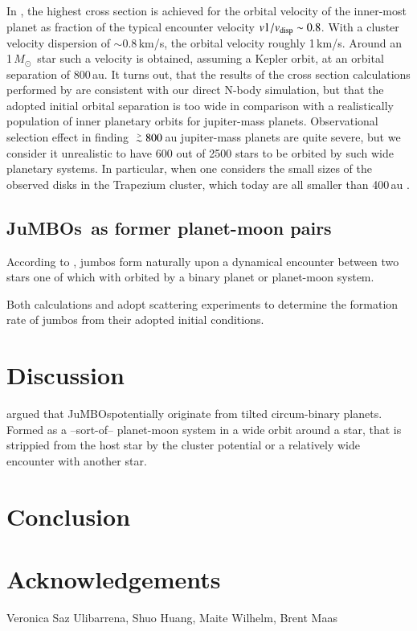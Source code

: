 \documentclass[aa]{lib/aa}
\newcommand{\MSun}{\mbox{${M}_\odot$}}
\def\apgt{\ {\raise-.5ex\hbox{$\buildrel>\over\sim$}}\ }
\newcommand{\jumbos}{\mbox{JuMBOs}}
\begin{document}
In \cite{2023arXiv231006016W}, the highest cross section is achieved
for the orbital velocity of the inner-most planet as fraction of the
typical encounter velocity $v1/v_{\rm disp} \sim 0.8$. With a cluster
velocity dispersion of $\sim 0.8$\,km/s, the orbital velocity roughly
1\,km/s. Around an 1\,\MSun\, star such a velocity is obtained,
assuming a Kepler orbit, at an orbital separation of 800\,au. It turns
out, that the results of the cross section calculations performed by
\cite{2023arXiv231006016W} are consistent with our direct N-body
simulation, but that the adopted initial orbital separation is too
wide in comparison with a realistically population of inner planetary
orbits for jupiter-mass planets.  Observational selection effect in
finding $\apgt 800$\,au jupiter-mass planets are quite severe, but we
consider it unrealistic to have 600 out of 2500 stars to be orbited by
such wide planetary systems. In particular, when one considers the
small sizes of the observed disks in the Trapezium cluster, which
today are all smaller than 400\,au \citep{2005A&A...441..195V}.



\subsection{\jumbos\, as former planet-moon pairs}

According to \cite{2023arXiv231015603C}, jumbos form naturally upon a
dynamical encounter between two stars one of which with orbited by a
binary planet or planet-moon system.

Both calculations \cite{2023arXiv231006016W} and
\cite{2023arXiv231015603C} adopt scattering experiments to determine
the formation rate of jumbos from their adopted initial conditions.


\section{Discussion}

\cite{2023arXiv231015603C} argued that \jumbos potentially originate
from tilted circum-binary planets. Formed as a --sort-of-- planet-moon
system in a wide orbit around a star, that is strippied from the host
star by the cluster potential or a relatively wide encounter with
another star. 



\section{Conclusion}

\section*{Acknowledgements}

Veronica Saz Ulibarrena, Shuo Huang, Maite Wilhelm, Brent Maas
    

    
\end{document}
